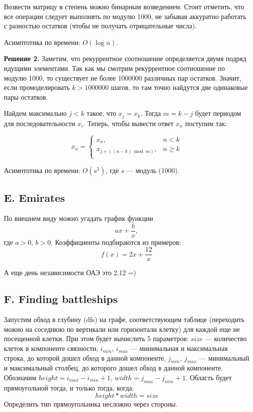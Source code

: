 \documentclass[10pt, a4paper]{article}
\begin{document}
Возвести матрицу в степень можно бинарным возведением. Стоит отметить, что все операции следует выполнять по модулю 1000, не забывая аккуратно работать с разностью остатков (чтобы не получать отрицательные числа). 

Асимптотика по времени: $O(\log n )$.

\textbf{Решение 2.} Заметим, что рекуррентное соотношение определяется двумя подряд идущими элементами. Так как мы смотрим рекуррентное соотношение по модулю 1000, то существует не более 1000000 различных пар остатков. Значит, если промоделировать $k > 1000000$ шагов, то там точно найдутся две одинаковые пары остатков. 

Найдем максимально $j < k$ такое, что $x_j = x_k$. Тогда $m = k - j$ будет периодом для последовательности $x_i$. Теперь, чтобы вывести ответ $x_n$ поступим так: 

$$
x_n = 
\begin{cases}
x_n, & n < k \\
x_{j + ((n - k) \bmod m)}, & n \geqslant k \\
\end{cases}
$$

Асимптотика по времени: $O(s^2)$, где $s$ --- модуль (1000).





\subsection*{E. Emirates}
По внешнем виду можно угадать график функции $$a x + \frac{b}{x},$$ где $a > 0$, $b > 0$. Коэффициенты подбираются из примеров:
$$f(x) = 2 x + \frac{12}{x}$$


А еще день независимости ОАЭ это 2.12 =)





\subsection*{F. Finding battleships}

Запустим обход в глубину (dfs) на графе, соответствующем таблице (переходить можно на соседнюю по вертикали или горизонтали клетку) для каждой еще не посещенной клетки. При этом будет вычислить 5 параметров: $size$ --- количество клеток в компоненте связности, $i_{min}$, $i_{max}$ --- минимальная и максимальная строка, до которой дошел обход в данной компоненте, $j_{min}$, $j_{max}$ --- минимальный и максимальный столбец, до которого дошел обход в данной компоненте. Обозначим $height = i_{max} - i_{min} + 1$, $width = j_{max} - j_{min} + 1$. 
Область будет прямоугольной тогда, и только тогда, когда:
$$ height * width = size$$
Определить тип прямоугольника несложно через стороны.
\end{document}
